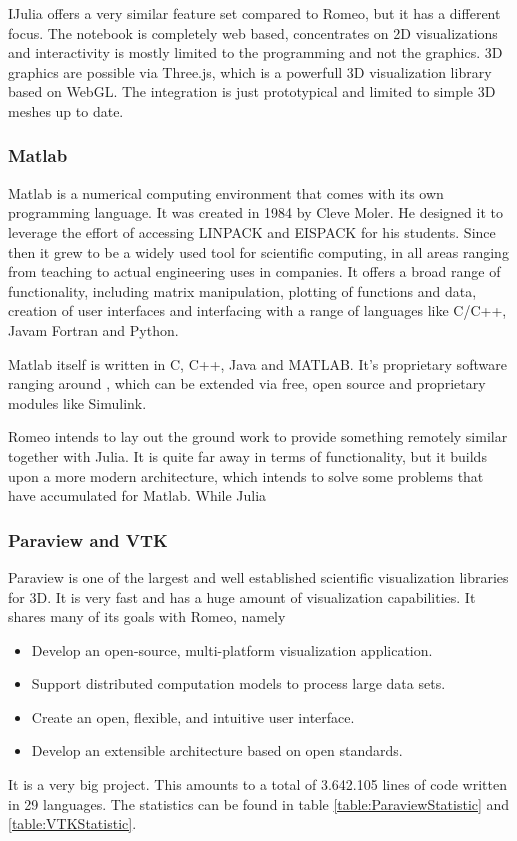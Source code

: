 IJulia offers a very similar feature set compared to Romeo, but it has a different focus.
The notebook is completely web based, concentrates on 2D visualizations and interactivity is mostly limited to the programming and not the graphics.
3D graphics are possible via Three.js, which is a powerfull 3D visualization library based on WebGL.
The integration is just prototypical and limited to simple 3D meshes up to date.


\subsubsection{Matlab}

\ac{Matlab} is a numerical computing environment that comes with its own programming language.
It was created in 1984 by Cleve Moler. He designed it to leverage the effort of accessing LINPACK and EISPACK for his students.
Since then it grew to be a widely used tool for scientific computing, in all areas ranging from teaching to actual engineering uses in companies.
It offers a broad range of functionality, including matrix manipulation, plotting of functions and data, creation of user interfaces and interfacing with a range of languages like C/C++, Javam Fortran and Python.

\ac{Matlab} itself is written in C, C++, Java and MATLAB.
It's proprietary software ranging around  \cite{MatlabPricing}, which can be extended via free, open source and proprietary modules like Simulink.

Romeo intends to lay out the ground work to provide something remotely similar together with Julia. It is quite far away in terms of functionality, but it builds upon a more modern architecture, which intends to solve some problems that have accumulated for Matlab.
While Julia 

\subsubsection{Paraview and VTK}


Paraview is one of the largest and well established scientific visualization libraries for 3D.
It is very fast and has a huge amount of visualization capabilities. It shares many of its goals with Romeo, namely \cite{Paraview}
\begin{itemize}
	\item Develop an open-source, multi-platform visualization application.
	\item Support distributed computation models to process large data sets.
	\item Create an open, flexible, and intuitive user interface.
	\item Develop an extensible architecture based on open standards.
\end{itemize}
It is a very big project.
This amounts to a total of 3.642.105 lines of code written in 29 languages. The statistics can be found in table \ref{table:ParaviewStatistic} and \ref{table:VTKStatistic}.

